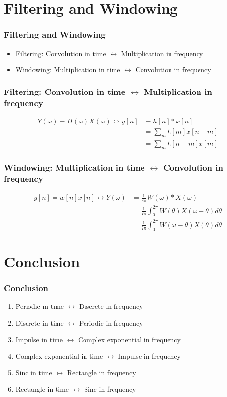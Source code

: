 \documentclass{beamer}
\begin{document}
\section{Filtering and Windowing}
\setcounter{subsection}{1}

\begin{frame}
  \frametitle{Filtering and Windowing}

  \begin{itemize}
  \item Filtering: Convolution in time $\leftrightarrow$ Multiplication in frequency
  \item Windowing: Multiplication in time $\leftrightarrow$ Convolution in frequency
  \end{itemize}
\end{frame}

\begin{frame}
  \frametitle{Filtering: Convolution in time $\leftrightarrow$ Multiplication in frequency}

  \begin{align*}
    Y(\omega)=H(\omega)X(\omega) \leftrightarrow y[n]&=h[n]\ast x[n]\\
    &= \sum_m h[m]x[n-m] \\
    &= \sum_m h[n-m]x[m]
  \end{align*}
\end{frame}

\begin{frame}
  \frametitle{Windowing: Multiplication in time $\leftrightarrow$ Convolution in frequency}

  \begin{align*}
    y[n]=w[n]x[n] \leftrightarrow Y(\omega)&=\frac{1}{2\pi}W(\omega)\ast X(\omega)\\
    &= \frac{1}{2\pi}\int_0^{2\pi}W(\theta)X(\omega-\theta)d\theta\\
    &= \frac{1}{2\pi}\int_0^{2\pi}W(\omega-\theta)X(\theta)d\theta
  \end{align*}
\end{frame}

\section{Conclusion}
\setcounter{subsection}{1}

\begin{frame}
  \frametitle{Conclusion}
  \begin{enumerate}
  \item Periodic in time $\leftrightarrow$ Discrete in frequency
  \item Discrete in time $\leftrightarrow$ Periodic in frequency
  \item Impulse in time $\leftrightarrow$ Complex exponential in frequency
  \item Complex exponential in time $\leftrightarrow$ Impulse in frequency
  \item Sinc in time $\leftrightarrow$ Rectangle in frequency
  \item Rectangle in time $\leftrightarrow$ Sinc in frequency
  \end{enumerate}
\end{frame}
\end{document}
